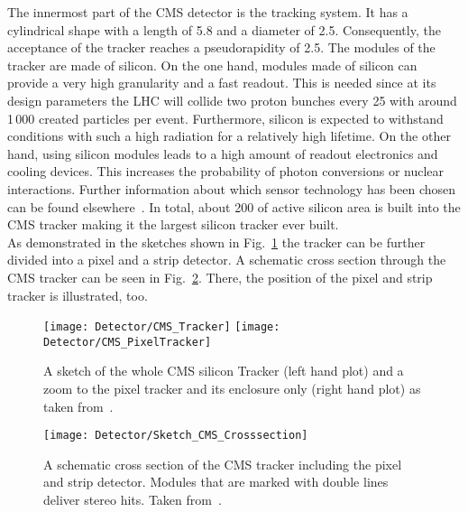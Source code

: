 The innermost part of the CMS detector is the tracking system. It has a cylindrical shape with a length of 5.8\m{} and a diameter of 2.5\m{}. Consequently, the acceptance of the tracker reaches a pseudorapidity of 2.5. The modules of the tracker are made of silicon. On the one hand, modules made of silicon can provide a very high granularity and a fast readout. This is needed since at its design parameters the LHC will collide two proton bunches every 25\ns{} with around 1\,000 created particles per event. Furthermore, silicon is expected to withstand conditions with such a high radiation for a relatively high lifetime. On the other hand, using silicon modules leads to a high amount of readout electronics and cooling devices. This increases the probability of photon conversions or nuclear interactions. Further information about which sensor technology has been chosen can be found elsewhere~\cite{Chatrchyan:1129810}. In total, about 200\ms{} of active silicon area is built into the CMS tracker making it the largest silicon tracker ever built.\\
As demonstrated in the sketches shown in Fig.~\ref{plot:LHCCMSTrackerCMS} the tracker can be further divided into a pixel and a strip detector. A schematic cross section through the CMS tracker can be seen in Fig.~\ref{plot:LHCCMSTrackerCrossCMS}. There, the position of the pixel and strip tracker is illustrated, too.

\begin{figure}[Htb]
    \centering
    \texttt{[image: Detector/CMS\_Tracker]}
    \texttt{[image: Detector/CMS\_PixelTracker]}
    \caption[Sketches of the CMS Tracker]{A sketch of the whole CMS silicon Tracker (left hand plot) and a zoom to the pixel tracker and its enclosure only (right hand plot) as taken from~. \label{plot:LHCCMSTrackerCMS}}
\end{figure}

\begin{figure}[Htb]
    \centering
    \texttt{[image: Detector/Sketch\_CMS\_Crosssection]}
    \caption[Schematic cross section of the CMS Tracker]{A schematic cross section of the CMS tracker including the pixel and strip detector. Modules that are marked with double lines deliver stereo hits. Taken from~. \label{plot:LHCCMSTrackerCrossCMS}}
\end{figure}

